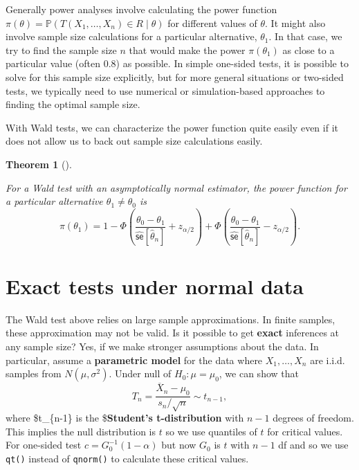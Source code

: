 \documentclass[
  letterpaper,
  DIV=11,
  numbers=noendperiod]{scrreprt}
\newcommand{\se}{\textsf{se}}
\renewcommand{\P}{\mathbb{P}}
\newcommand{\Xbar}{\overline{X}}
\theoremstyle{definition}
\theoremstyle{plain}
\newtheorem{theorem}{Theorem}[chapter]
\theoremstyle{definition}
\theoremstyle{remark}
\begin{document}
Generally power analyses involve calculating the power function
\(\pi(\theta) = \P(T(X_1, \ldots, X_n) \in R \mid \theta)\) for
different values of \(\theta\). It might also involve sample size
calculations for a particular alternative, \(\theta_1\). In that case,
we try to find the sample size \(n\) that would make the power
\(\pi(\theta_1)\) as close to a particular value (often 0.8) as
possible. In simple one-sided tests, it is possible to solve for this
sample size explicitly, but for more general situations or two-sided
tests, we typically need to use numerical or simulation-based approaches
to finding the optimal sample size.

With Wald tests, we can characterize the power function quite easily
even if it does not allow us to back out sample size calculations
easily.

\leavevmode{}%
\begin{theorem}[]\label{thm-power}

For a Wald test with an asymptotically normal estimator, the power
function for a particular alternative \(\theta_1 \neq \theta_0\) is \[ 
\pi(\theta_1) = 1 - \Phi\left( \frac{\theta_0 - \theta_1}{\widehat{\se}[\widehat{\theta}_n]} + z_{\alpha/2} \right) + \Phi\left( \frac{\theta_0 - \theta_1}{\widehat{\se}[\widehat{\theta}_n]}-z_{\alpha/2} \right).
\]

\end{theorem}

\hypertarget{exact-tests-under-normal-data}{%
\section{Exact tests under normal
data}\label{exact-tests-under-normal-data}}

The Wald test above relies on large sample approximations. In finite
samples, these approximation may not be valid. Is it possible to get
\textbf{exact} inferences at any sample size? Yes, if we make stronger
assumptions about the data. In particular, assume a \textbf{parametric
model} for the data where \(X_1,\ldots,X_n\) are i.i.d. samples from
\(N(\mu,\sigma^2)\). Under null of \(H_0: \mu = \mu_0\), we can show
that \[ 
T_n = \frac{\Xbar_n - \mu_0}{s_n/\sqrt{n}} \sim t_{n-1},
\] where \$t\_\{n-1\} is the \$\textbf{Student's t-distribution} with
\(n-1\) degrees of freedom. This implies the null distribution is \(t\)
so we use quantiles of \(t\) for critical values. For one-sided test
\(c = G^{-1}_0(1 - \alpha)\) but now \(G_0\) is \(t\) with \(n-1\) df
and so we use \texttt{qt()} instead of \texttt{qnorm()} to calculate
these critical values.
\end{document}
